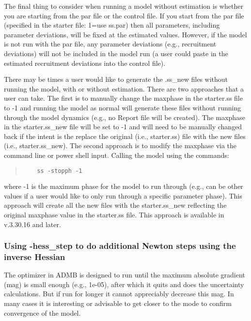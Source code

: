 The final thing to consider when running a model without estimation is whether you are starting from the par file or the control file.  If you start from the par file (specified in the starter file: 1=use ss.par) then all parameters, including parameter deviations, will be fixed at the estimated values.  However, if the model is not run with the par file, any parameter deviations (e.g., recruitment deviations) will not be included in the model run (a user could paste in the estimated recruitment deviations into the control file). 

There may be times a user would like to generate the .ss\_new files without running the model, with or without estimation. There are two approaches that a user can take.  The first is to manually change the maxphase in the starter.ss file to -1 and running the model as normal will generate these files without running through the model dynamics (e.g., no Report file will be created). The maxphase in the starter.ss\_new file will be set to -1 and will need to be manually changed back if the intent is the replace the original (i.e., starter.ss) file with the new files (i.e., starter.ss\_new).  The second approach is to modify the maxphase via the command line or power shell input. Calling the model using the commands:

\begin{quote}
	\begin{verbatim}
	ss -stopph -1
	\end{verbatim}
\end{quote}  

where -1 is the maximum phase for the model to run through (e.g., can be other values if a user would like to only run through a specific parameter phase). This approach will create all the new files with the starter.ss\_new reflecting the original maxphase value in the starter.ss file. This approach is available in v.3.30.16 and later.

\hypertarget{hess-step}{}
\subsubsection{Using -hess\_step to do additional Newton steps using the inverse Hessian}

The optimizer in ADMB is designed to run until the maximum absolute gradient (mag) is small enough (e.g., 1e-05), after which it quits and does the uncertainty calculations. But if run for longer it cannot appreciably decrease this mag. In many cases it is interesting or advisable to get closer to the mode to confirm convergence of the model. 

